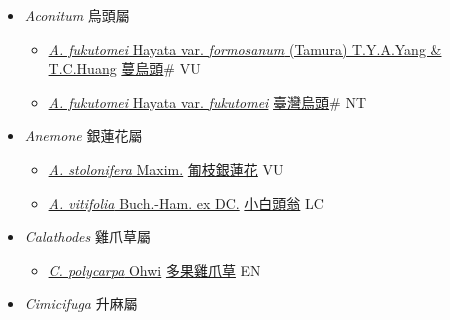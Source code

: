 
  \begin{itemize}
 \item[] \textit{Aconitum} 烏頭屬
                    
  \begin{itemize}
        \item[] \href{http://www.theplantlist.org/tpl1.1/search?q=Aconitum+fukutomei+var.+formosanum}{\textit{A. fukutomei} Hayata var. \textit{formosanum} (Tamura) T.Y.A.Yang \& T.C.Huang}   \href{\detokenize{http://taibnet.sinica.edu.tw/chi/taibnet_species_list.php?T2=蔓烏頭&T2_new_value=true&fr=y}}{蔓烏頭}\# VU
        \item[] \href{http://www.theplantlist.org/tpl1.1/search?q=Aconitum+fukutomei+var.+fukutomei}{\textit{A. fukutomei} Hayata var. \textit{fukutomei}}   \href{\detokenize{http://taibnet.sinica.edu.tw/chi/taibnet_species_list.php?T2=臺灣烏頭&T2_new_value=true&fr=y}}{臺灣烏頭}\# NT
  \end{itemize}
 \item[] \textit{Anemone} 銀蓮花屬
                    
  \begin{itemize}
        \item[] \href{http://www.theplantlist.org/tpl1.1/search?q=Anemone+stolonifera}{\textit{A. stolonifera} Maxim.}   \href{\detokenize{http://taibnet.sinica.edu.tw/chi/taibnet_species_list.php?T2=匍枝銀蓮花&T2_new_value=true&fr=y}}{匍枝銀蓮花} VU
        \item[] \href{http://www.theplantlist.org/tpl1.1/search?q=Anemone+vitifolia}{\textit{A. vitifolia} Buch.-Ham. ex DC.}   \href{\detokenize{http://taibnet.sinica.edu.tw/chi/taibnet_species_list.php?T2=小白頭翁&T2_new_value=true&fr=y}}{小白頭翁} LC
  \end{itemize}
 \item[] \textit{Calathodes} 雞爪草屬
                    
  \begin{itemize}
        \item[] \href{http://www.theplantlist.org/tpl1.1/search?q=Calathodes+polycarpa}{\textit{C. polycarpa} Ohwi}   \href{\detokenize{http://taibnet.sinica.edu.tw/chi/taibnet_species_list.php?T2=多果雞爪草&T2_new_value=true&fr=y}}{多果雞爪草} EN
  \end{itemize}
 \item[] \textit{Cimicifuga} 升麻屬
                    

\end{itemize}
